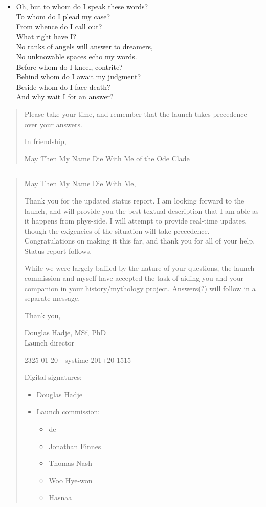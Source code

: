 \begin{itemize}
\item
  Oh, but to whom do I speak these words?\\
  To whom do I plead my case?\\
  From whence do I call out?\\
  What right have I?\\
  No ranks of angels will answer to dreamers,\\
  No unknowable spaces echo my words.\\
  Before whom do I kneel, contrite?\\
  Behind whom do I await my judgment?\\
  Beside whom do I face death?\\
  And why wait I for an answer?
\end{itemize}

\begin{quote}
Please take your time, and remember that the launch takes precedence over your answers.

In friendship,

May Then My Name Die With Me of the Ode Clade
\end{quote}

\begin{center}\rule{0.5\linewidth}{0.5pt}\end{center}

\begin{quote}
May Then My Name Die With Me,

Thank you for the updated status report. I am looking forward to the launch, and will provide you the best textual description that I am able as it happens from phys-side. I will attempt to provide real-time updates, though the exigencies of the situation will take precedence. Congratulations on making it this far, and thank you for all of your help. Status report follows.

While we were largely baffled by the nature of your questions, the launch commission and myself have accepted the task of aiding you and your companion in your history/mythology project. Answers(?) will follow in a separate message.

Thank you,

Douglas Hadje, MSf, PhD\\
Launch director

2325-01-20---systime 201+20 1515

Digital signatures:

\begin{itemize}
\tightlist
\item
  Douglas Hadje
\item
  Launch commission:

  \begin{itemize}
  \tightlist
  \item
    de
  \item
    Jonathan Finnes
  \item
    Thomas Nash
  \item
    Woo Hye-won
  \item
    Hasnaa
  \end{itemize}
\end{itemize}
\end{quote}

